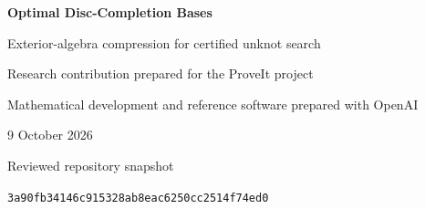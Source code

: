 \documentclass[11pt,a4paper]{article}
\theoremstyle{remark}\newtheorem{remark}[theorem]{Remark}
\newcommand{\snapshot}{3a90fb34146c915328ab8eac6250cc2514f74ed0}
\begin{document}
\begin{titlepage}
\vspace*{15mm}
\begin{center}
{\LARGE\bfseries Optimal Disc-Completion Bases\par}
\vspace{4mm}
{\Large Exterior-algebra compression for certified unknot search\par}
\vspace{10mm}
{\large Research contribution prepared for the ProveIt project\par}
\vspace{2mm}
{Mathematical development and reference software prepared with OpenAI\par}
\vspace{6mm}
{9 October 2026\par}
\vspace{3mm}
{\small Reviewed repository snapshot\par\texttt{\snapshot}\par}
\end{center}
\vspace{9mm}
\begin{abstract}
An exact component-state space can contain Bell-many partitions without forcing a disc-existence search to retain Bell-many candidates. We make this distinction effective for surfaces glued along individually labelled boundary intervals. Their disc-completion relation has binary matrix rank exactly $2^{r-1}$ on $r$ intervals, with grade-$d$ rank exactly $\binom{r-1}{d}$. Cost-ordered exterior bases therefore retain at most $2^{r-1}$ actual candidates while preserving every minimum-cost disc completion. This bound is optimal even for unweighted subfamily selection. The same bases preserve acyclic completions, grade by grade.

The method specializes classical linear-matroid representative families and sharpens the stated $r2^{r-1}$ size bound for acyclic weighted partitions. We identify exactly what the older rank-stratified cut representation retains unnecessarily: its full-family size is $(r-1)2^{r-2}+1$ for $r\ge2$, whereas disc completion needs only $2^{r-1}$. A homogeneous-degree projection explains the difference and yields an explicit rooted-transversal coordinate formula.


\end{abstract}
\end{titlepage}
\end{document}
